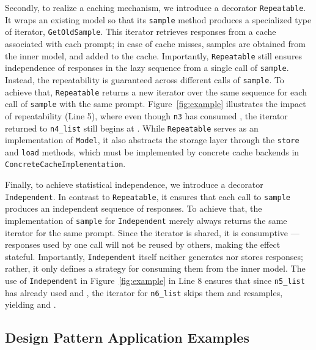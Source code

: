 \documentclass[sigconf]{acmart}
\begin{document}
Secondly, to realize a caching mechanism, we introduce a decorator \texttt{Repeatable}. It wraps an existing model so that its \texttt{sample} method produces a specialized type of iterator, \texttt{GetOldSample}. This iterator retrieves responses from a cache associated with each prompt; in case of cache misses, samples are obtained from the inner model, and added to the cache. Importantly, \texttt{Repeatable} still ensures independence of responses in the lazy sequence from a single call of \texttt{sample}. Instead, the repeatability is guaranteed across different calls of \texttt{sample}. To achieve that, \texttt{Repeatable} returns a new iterator over the same sequence for each call of \texttt{sample} with the same prompt. Figure~\ref{fig:example} illustrates the impact of repeatability (Line 5), where even though \texttt{n3} has consumed \texttt{\textquotedbl}, the iterator returned to \texttt{n4\_list} still begins at \texttt{\textquotedbl}. While \texttt{Repeatable} serves as an implementation of \texttt{Model}, it also abstracts the storage layer through the \texttt{store} and \texttt{load} methods, which must be implemented by concrete cache backends in \texttt{ConcreteCacheImplementation}.

Finally, to achieve statistical independence, we introduce a decorator \texttt{Independent}. In contrast to \texttt{Repeatable}, it ensures that each call to \texttt{sample} produces an independent sequence of responses. To achieve that, the implementation of \texttt{sample} for \texttt{Independent} merely always returns the same iterator for the same prompt. Since the iterator is shared, it is consumptive --- responses used by one call will not be reused by others, making the effect stateful. Importantly, \texttt{Independent} itself neither generates nor stores responses; rather, it only defines a strategy for consuming them from the inner model. The use of \texttt{Independent} in Figure~\ref{fig:example} in Line 8 ensures that since \texttt{n5\_list} has already used \texttt{\textquotedbl} and \texttt{\textquotedbl}, the iterator for \texttt{n6\_list} skips them and resamples, yielding \texttt{\textquotedbl} and \texttt{\textquotedbl}.

\subsection{Design Pattern Application Examples}
\label{sec:examples}
\end{document}
